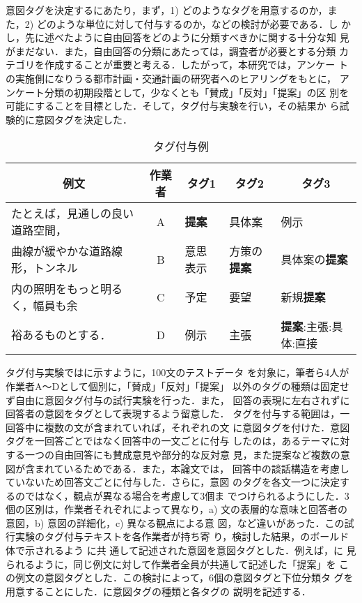 意図タグを決定するにあたり，まず，1) どのようなタグを用意するのか，ま
た，2) どのような単位に対して付与するのか，などの検討が必要である．し
かし，先に述べたように自由回答をどのように分類すべきかに関する十分な知
見がまだない．また，自由回答の分類にあたっては，調査者が必要とする分類
カテゴリを作成することが重要と考える．したがって，本研究では，アンケー
トの実施側になりうる都市計画・交通計画の研究者へのヒアリングをもとに，
アンケート分類の初期段階として，少なくとも「賛成」「反対」「提案」の区
別を可能にすることを目標とした．そして，タグ付与実験を行い，その結果か
ら試験的に意図タグを決定した．


\begin{table}[t]
\begin{center}
\leavevmode
\caption{タグ付与例}
\label{tab:tagging_example}
\begin{tabular}{|l|c|l|l|l|}
\hline
\multicolumn{1}{|c|}{例文}
&\multicolumn{1}{c|}{作業者}
&\multicolumn{1}{c|}{タグ1}
&\multicolumn{1}{c|}{タグ2}
&\multicolumn{1}{c|}{タグ3}
\\ \hline \hline
たとえば，見通しの良い道路空間，
&\multicolumn{1}{c|}{A}
&{\bf 提案}
&具体案
&例示
\\ \cline{2-5}
曲線が緩やかな道路線形，トンネル
&\multicolumn{1}{c|}{B}
&意思表示
&方策の{\bf 提案 }
&具体案の{\bf 提案}
\\ \cline{2-5}
内の照明をもっと明るく，幅員も余
&\multicolumn{1}{c|}{C}
&予定
&要望
&新規{\bf 提案}
\\ \cline{2-5}
裕あるものとする．
&\multicolumn{1}{c|}{D}
&例示
&主張
&{\bf 提案}:主張:具体:直接
\\ \hline
\end{tabular}
\end{center}
\end{table}


タグ付与実験ではに示すように，100文のテストデータ
を対象に，筆者ら4人が作業者A〜Dとして個別に，「賛成」「反対」「提案」
以外のタグの種類は固定せず自由に意図タグ付与の試行実験を行った．また，
回答の表現に左右されずに回答者の意図をタグとして表現するよう留意した．
タグを付与する範囲は，一回答中に複数の文が含まれていれば，それぞれの文
に意図タグを付けた．意図タグを一回答ごとではなく回答中の一文ごとに付与
したのは，あるテーマに対する一つの自由回答にも賛成意見や部分的な反対意
見，また提案など複数の意図が含まれているためである．また，本論文では，
回答中の談話構造を考慮していないため回答文ごとに付与した．さらに，意図
のタグを各文一つに決定するのではなく，観点が異なる場合を考慮して3個ま
でつけられるようにした．3個の区別は，作業者それぞれによって異なり，a) 
文の表層的な意味と回答者の意図，b) 意図の詳細化，c) 異なる観点による意
図，など違いがあった．この試行実験のタグ付与テキストを各作業者が持ち寄
り，検討した結果，のボールド体で示されるよう
に共
通して記述された意図を意図タグとした．例えば，に
見られるように，同じ例文に対して作業者全員が共通して記述した「提案」を
この例文の意図タグとした．この検討によって，6個の意図タグと下位分類タ
グを用意することにした．に意図タグの種類と各タグの
説明を記述する．


